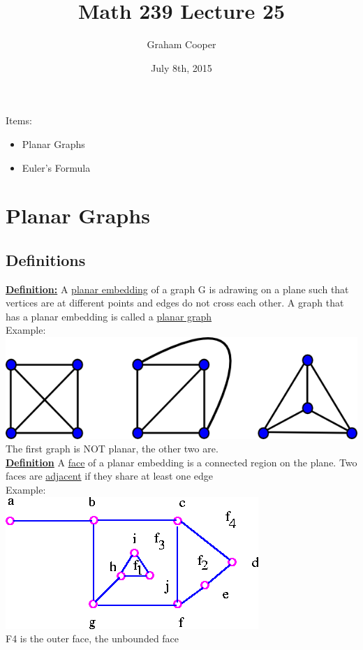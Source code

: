 \documentclass[12pt]{article}
\title{\vspace{-15ex}Math 239 Lecture 25\vspace{-1ex}}
\date{July 8th, 2015}
\author{Graham Cooper}
\newcommand{\myt}[1]{\textbf{\underline{#1}}}
\begin{document}
	\maketitle
	Items:\\
	\begin{itemize}
		\item Planar Graphs
		\item Euler's Formula
	\end{itemize}
	
	\section*{Planar Graphs}
	\subsection*{Definitions}
	\myt{Definition:} A \underline{planar embedding} of a graph G is adrawing on a plane such that vertices are at different points and edges do not cross each other. A graph that has a planar embedding is called a \underline{planar graph}\\
	
	Example:\\
	\includegraphics[scale=0.5]{planar.png}\\
	The first graph is NOT planar, the other two are.\\
	
	\myt{Definition} A \underline{face} of a planar embedding is a connected region on the plane. Two faces are \underline{adjacent} if they share at least one edge\\
	
	Example:\\
	\includegraphics[scale=0.5]{faces.png}\\
	F4 is the outer face, the unbounded face\\
	
\end{document}
